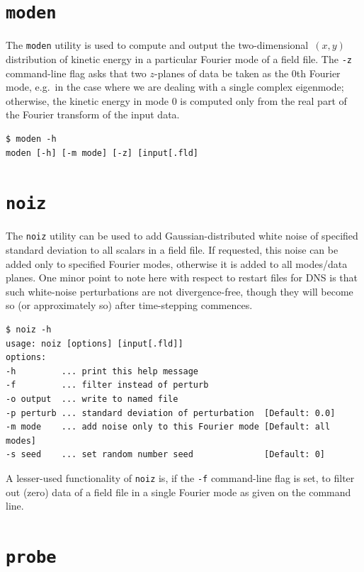 \documentclass[11pt]{report}
\newcommand\twod{two-di\-men\-sion\-al}
\newcommand{\eg}{e.g.\ } \newcommand{\CC}{\mathrm{c.c.}}
\begin{document}
\section{\texttt{moden}}
\label{sec.moden}

The \verb|moden| utility is used to compute and output the
\twod\ $(x,y)$ distribution of kinetic energy in a particular Fourier
mode of a field file.  The \verb|-z| command-line flag asks that two
$z$-planes of data be taken as the 0th Fourier mode, \eg in the case
where we are dealing with a single complex eigenmode; otherwise, the
kinetic energy in mode 0 is computed only from the real part of the
Fourier transform of the input data.
%
{\small
\begin{verbatim}
$ moden -h
moden [-h] [-m mode] [-z] [input[.fld]
\end{verbatim}
}

\section{\texttt{noiz}}
\label{sec.noiz}

The \verb|noiz| utility can be used to add Gaussian-distributed white
noise of specified standard deviation to all scalars in a field
file. If requested, this noise can be added only to specified Fourier
modes, otherwise it is added to all modes/data planes.  One minor
point to note here with respect to restart files for DNS is that such
white-noise perturbations are not divergence-free, though they will
become so (or approximately so) after time-stepping commences.
%
{\small
\begin{verbatim}
$ noiz -h
usage: noiz [options] [input[.fld]]
options:
-h         ... print this help message
-f         ... filter instead of perturb
-o output  ... write to named file
-p perturb ... standard deviation of perturbation  [Default: 0.0]
-m mode    ... add noise only to this Fourier mode [Default: all modes]
-s seed    ... set random number seed              [Default: 0]
\end{verbatim}
}
%
A lesser-used functionality of \verb|noiz| is, if the \verb|-f|
command-line flag is set, to filter out (zero) data of a field file in
a single Fourier mode as given on the command line.

\section{\texttt{probe}}
\label{sec.probe}
\end{document}
